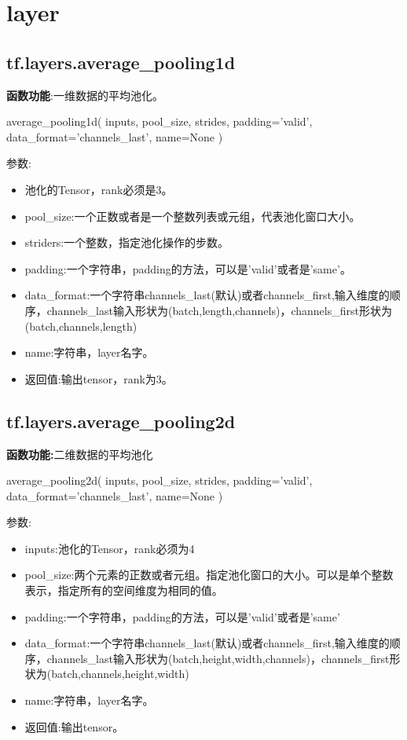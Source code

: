 \section{layer}
\subsection{tf.layers.average\_pooling1d}
\textbf{函数功能}:一维数据的平均池化。

\begin{python}
average_pooling1d(
    inputs,
    pool_size,
    strides,
    padding='valid',
    data_format='channels_last',
    name=None
)
\end{python}
参数:
\begin{itemize}
	\item 池化的Tensor，rank必须是3。
	\item pool\_size:一个正数或者是一个整数列表或元组，代表池化窗口大小。
	\item striders:一个整数，指定池化操作的步数。
	\item padding:一个字符串，padding的方法，可以是'valid'或者是'same'。
	\item data\_format:一个字符串channels\_last(默认)或者channels\_first,输入维度的顺序，channels\_last输入形状为(batch,length,channels)，channels\_first形状为(batch,channels,length)
	\item name:字符串，layer名字。
	\item 返回值:输出tensor，rank为3。
\end{itemize}
\subsection{tf.layers.average\_pooling2d}
\textbf{函数功能:}二维数据的平均池化
\begin{python}
average_pooling2d(
    inputs,
    pool_size,
    strides,
    padding='valid',
    data_format='channels_last',
    name=None
)
\end{python}

参数:
\begin{itemize}
	\item inputs:池化的Tensor，rank必须为4
	\item pool\_size:两个元素的正数或者元组。指定池化窗口的大小。可以是单个整数表示，指定所有的空间维度为相同的值。
	\item padding:一个字符串，padding的方法，可以是'valid'或者是'same'
	\item data\_format:一个字符串channels\_last(默认)或者channels\_first,输入维度的顺序，channels\_last输入形状为(batch,height,width,channels)，channels\_first形状为(batch,channels,height,width)
	\item name:字符串，layer名字。
	\item 返回值:输出tensor。
\end{itemize}
